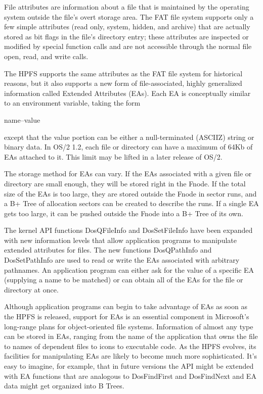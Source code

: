 File attributes are information about a file that is maintained by the
operating system outside the file's overt storage area.  The FAT file system
supports only a few simple attributes (read only, system, hidden, and
archive) that are actually stored as bit flags in the file's directory entry;
these attributes are inspected or modified by special function calls and are
not accessible through the normal file open, read, and write calls.
 
The HPFS supports the same attributes as the FAT file system for historical
reasons, but it also supports a new form of file-associated, highly
generalized information called Extended Attributes (EAs).  Each EA is
conceptually similar to an environment variable, taking the form
\begin{center}
name--value
\end{center}
except that the value portion can be either a null-terminated (ASCIIZ) string
or binary data. In OS/2 1.2, each file or directory can have a maximum of
64Kb of EAs attached to it.  This limit may be lifted in a later release of
OS/2.
 
The storage method for EAs can vary.  If the EAs associated with a given file
or directory are small enough, they will be stored right in the Fnode.  If
the total size of the EAs is too large, they are stored outside the Fnode in
sector runs, and a B+ Tree of allocation sectors can be created to describe
the runs.  If a single EA gets too large, it can be pushed outside the Fnode
into a B+ Tree of its own.
 
The kernel API functions DosQFileInfo and DosSetFileInfo have been expanded
with new information levels that allow application programs to manipulate
extended attributes for files.  The new functions DosQPathInfo and
DosSetPathInfo are used to read or write the EAs associated with arbitrary
pathnames.  An application program can either ask for the value of a specific
EA (supplying a name to be matched) or can obtain all of the EAs for the file
or directory at once.
 
Although application programs can begin to take advantage of EAs as soon as
the HPFS is released, support for EAs is an essential component in
Microsoft's long-range plans for object-oriented file systems. Information of
almost any type can be stored in EAs, ranging from the name of the
application that owns the file to names of dependent files to icons to
executable code.  As the HPFS evolves, its facilities for manipulating EAs
are likely to become much more sophisticated.  It's easy to imagine, for
example, that in future versions the API might be extended with EA functions
that are analogous to DosFindFirst and DosFindNext and EA data might get
organized into B Trees.
 
